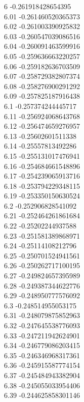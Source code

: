 {6	-0.261918428654395\\
6.01	-0.261460520365373\\
6.02	-0.261003390925832\\
6.03	-0.260547039086516\\
6.04	-0.260091463599916\\
6.05	-0.259636663220257\\
6.06	-0.259182636703509\\
6.07	-0.258729382807374\\
6.08	-0.258276900291292\\
6.09	-0.257825187916438\\
6.1	-0.257374244445717\\
6.11	-0.256924068643768\\
6.12	-0.256474659276957\\
6.13	-0.25602601511338\\
6.14	-0.25557813492286\\
6.15	-0.255131017476941\\
6.16	-0.254684661548896\\
6.17	-0.254239065913716\\
6.18	-0.253794229348115\\
6.19	-0.253350150630524\\
6.2	-0.252906828541092\\
6.21	-0.252464261861684\\
6.22	-0.25202244937588\\
6.23	-0.251581389868971\\
6.24	-0.25114108212796\\
6.25	-0.250701524941561\\
6.26	-0.250262717100195\\
6.27	-0.249824657395989\\
6.28	-0.249387344622776\\
6.29	-0.248950777576092\\
6.3	-0.248514955053175\\
6.31	-0.248079875852963\\
6.32	-0.247645538776093\\
6.33	-0.247211942624901\\
6.34	-0.246779086203415\\
6.35	-0.246346968317361\\
6.36	-0.245915587774154\\
6.37	-0.245484943382904\\
6.38	-0.245055033954406\\
6.39	-0.244625858301146\\
}
